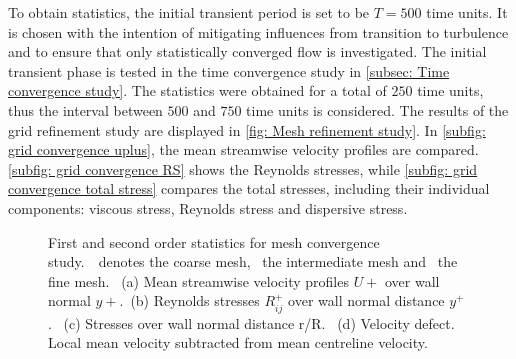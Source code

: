 To obtain statistics, the initial transient period is set to be $T = 500$ time units.
It is chosen  with the intention of mitigating influences from transition to turbulence and to ensure that only  statistically converged flow is investigated.
The initial transient phase is tested in the time convergence study in \autoref{subsec: Time convergence study}.
The statistics  were obtained for a total of $250$ time units, thus the interval between $500$ and  $750$ time units is considered.
The results of the grid refinement study are displayed in \autoref{fig: Mesh refinement study}.
In \autoref{subfig: grid convergence uplus}, the mean streamwise velocity profiles are compared.
\autoref{subfig: grid convergence RS} shows the Reynolds stresses, while \autoref{subfig: grid convergence total stress} compares the total stresses, including their individual components: viscous stress, Reynolds stress and dispersive stress.
\begin{figure}
    \centering
    \begin{subfigure}[t]{0.495\textwidth}
        \centering
        \subcaption{}
       
        \label{subfig: grid convergence uplus}
        
    \end{subfigure}
    \hfill
    \begin{subfigure}[t]{0.495\textwidth}
        \centering
        \subcaption{}
       
        \label{subfig: grid convergence RS}
    \end{subfigure}
    \plotverticalspacing
    \begin{subfigure}[t]{0.495\textwidth}
        \centering
        \subcaption{}
       
        \label{subfig: grid convergence total stress}
    \end{subfigure}
    \hfill
    \begin{subfigure}[t]{0.495\textwidth}
        \centering
        \subcaption{}
       
        \label{subfig: mesh convergence velocity defect}
    \end{subfigure}
    \plotverticalspacing
    \caption{First and second order statistics for mesh convergence study.\ \coarseMeshSymbol \ denotes the coarse mesh, \intermediatMeshSymbol \ the intermediate mesh and \fineMeshSymbol \ the fine mesh.~
    (a) Mean streamwise velocity profiles $U+$ over wall normal $y+$.~(b) Reynolds stresses $R_{ij}^+$ over wall normal distance $y^+$.~
    (c) Stresses over wall normal distance r/R.~
    (d) Velocity defect. Local mean velocity subtracted from mean centreline velocity.}
    \label{fig: Mesh refinement study}
\end{figure}


